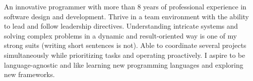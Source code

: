 

\begin{cvparagraph}

An innovative programmer with more than 8 years of
 professional experience in software design and development.
Thrive in a team environment with the ability to lead and
 follow leadership directives.
Understanding intricate systems and solving complex problems 
in a dynamic and result-oriented way is one of my strong
 suits (writing short sentences is not).
Able to coordinate several projects simultaneously
 while prioritizing tasks and operating proactively.
I aspire to be language-agnostic and like learning
 new programming languages and exploring new frameworks.
\end{cvparagraph}
